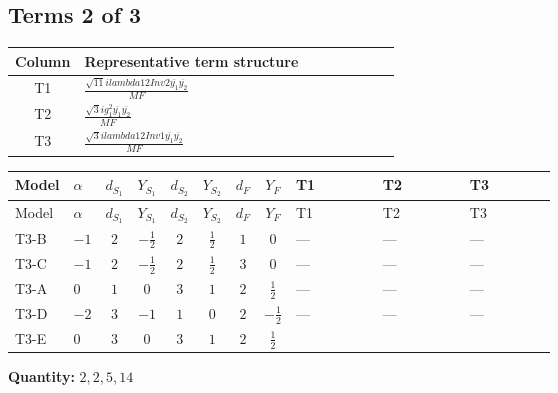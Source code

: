 \documentclass[8pt]{article}
\begin{document}
\begin{landscape}
\subsection*{Terms 2 of 3}
\begin{center}
\begin{tabular}{@{}c >{\raggedright\arraybackslash}p{0.82\linewidth}@{}}
\toprule
Column & Representative term structure \\
\midrule
T1 & \(\displaystyle \frac{\sqrt{11} i lambda12Inv2 \overline{y_{1}} \overline{y_{2}}}{MF}\) \\
\midrule
T2 & \(\displaystyle \frac{\sqrt{3} i g_{1}^{2} \overline{y_{1}} \overline{y_{2}}}{MF}\) \\
\midrule
T3 & \(\displaystyle \frac{\sqrt{3} i lambda12Inv1 \overline{y_{1}} \overline{y_{2}}}{MF}\) \\
\midrule
\bottomrule
\end{tabular}
\end{center}
\smallskip
\tiny
\begin{longtable}{@{}llcccccc >{\raggedright\arraybackslash}p{0.21\linewidth} >{\raggedright\arraybackslash}p{0.21\linewidth} >{\raggedright\arraybackslash}p{0.21\linewidth}@{}}
\toprule
Model & $\alpha$ & $d_{S_1}$ & $Y_{S_1}$ & $d_{S_2}$ & $Y_{S_2}$ & $d_F$ & $Y_F$ & T1 & T2 & T3 \\
\midrule
\endfirsthead
\toprule
Model & $\alpha$ & $d_{S_1}$ & $Y_{S_1}$ & $d_{S_2}$ & $Y_{S_2}$ & $d_F$ & $Y_F$ & T1 & T2 & T3 \\
\midrule
\endhead
T3-B & $-1$ & $2$ & $-\frac{1}{2}$ & $2$ & $\frac{1}{2}$ & $1$ & $0$ & --- & --- & --- \\
\midrule
T3-C & $-1$ & $2$ & $-\frac{1}{2}$ & $2$ & $\frac{1}{2}$ & $3$ & $0$ & --- & --- & --- \\
\midrule
T3-A & $0$ & $1$ & $0$ & $3$ & $1$ & $2$ & $\frac{1}{2}$ & --- & --- & --- \\
\midrule
T3-D & $-2$ & $3$ & $-1$ & $1$ & $0$ & $2$ & $-\frac{1}{2}$ & --- & --- & --- \\
\midrule
T3-E & $0$ & $3$ & $0$ & $3$ & $1$ & $2$ & $\frac{1}{2}$ & \scriptsize\adjustbox{max width=\linewidth}{$\begin{gathered} - \frac{3 \sqrt{11} i lambda12Inv2 \overline{y_{1}} \overline{y_{2}}}{22 MF}\end{gathered}$} & \scriptsize\adjustbox{max width=\linewidth}{$\begin{gathered} - \frac{\sqrt{3} i g_{1}^{2} \overline{y_{1}} \overline{y_{2}}}{8 MF}\end{gathered}$} & \scriptsize\adjustbox{max width=\linewidth}{$\begin{gathered} \frac{\sqrt{3} i lambda12Inv1 \overline{y_{1}} \overline{y_{2}}}{6 MF}\end{gathered}$} \\
\midrule
\bottomrule
\end{longtable}
\clearpage
\noindent\textbf{Quantity: }$\mathrm{2,2,5,14}$\par\smallskip

\end{landscape}
\end{document}
